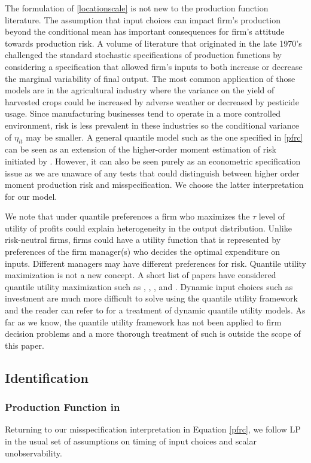 \documentclass[11pt]{article}
\begin{document}
The formulation of \eqref{locationscale} is not new to the production function literature. The assumption that input choices can impact firm's production beyond the conditional mean has important consequences for firm's attitude towards production risk. A volume of literature that originated in the late 1970's challenged the standard stochastic specifications of production functions \citep{Just1978,Just1979} by considering a specification that allowed firm's inputs to both increase or decrease the marginal variability of final output. The most common application of those models are in the agricultural industry where the variance on the yield of harvested crops could be increased by adverse weather or decreased by pesticide usage. Since manufacturing businesses tend to operate in a more controlled environment, risk is less prevalent in these industries so the conditional variance of $\eta_{it}$ may be smaller. A general quantile model such as the one specified in \eqref{pfrc} can be seen as an extension of the higher-order moment estimation of risk initiated by \cite{Antle1983}. However, it can also be seen purely as an econometric specification issue as we are unaware of any tests that could distinguish between higher order moment production risk and misspecification. We choose the latter interpretation for our model. 

We note that under quantile preferences a firm who maximizes the $\tau$ level of utility of profits could explain heterogeneity in the output distribution. Unlike risk-neutral firms, firms could have a utility function that is represented by preferences of the firm manager(s) who decides the optimal expenditure on inputs. Different managers may have different preferences for risk. Quantile utility maximization is not a new concept. A short list of papers have considered quantile utility maximization such as \cite{Manski1988}, \cite{ROSTEK2009}, \cite{Chambers2007}, and \cite{Bhattacharya2009}. Dynamic input choices such as investment are much more difficult to solve using the quantile utility framework and the reader can refer to \cite{Castro2017} for a treatment of dynamic quantile utility models. As far as we know, the quantile utility framework has not been applied to firm decision problems and a more thorough treatment of such is outside the scope of this paper.

\subsection{Identification}
\subsubsection{Production Function in \cite{Levinsohn2003}}
Returning to our misspecification interpretation in Equation \eqref{pfrc}, we follow LP in the usual set of assumptions on timing of input choices and scalar unobservability.
\end{document}

